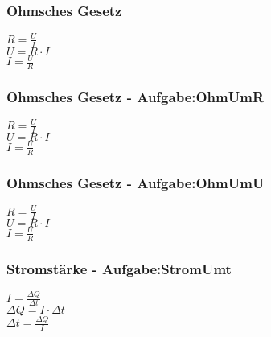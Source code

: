 \subsubsection{Ohmsches Gesetz} 
\begin{minipage}{0.45\textwidth} 
$ R = \frac{U}{I} $\\ 
$ U = R\cdot I $\\ 
$ I = \frac{U}{R} $\\ 
\end{minipage} 
\begin{minipage}{0.45\textwidth} 
 
\end{minipage} 
\subsubsection{Ohmsches Gesetz - Aufgabe:OhmUmR} 
\begin{minipage}{0.45\textwidth} 
$ R = \frac{U}{I} $\\ 
$ U = R\cdot I $\\ 
$ I = \frac{U}{R} $\\ 
\end{minipage} 
\begin{minipage}{0.45\textwidth} 
 
\end{minipage} 
\subsubsection{Ohmsches Gesetz - Aufgabe:OhmUmU} 
\begin{minipage}{0.45\textwidth} 
$ R = \frac{U}{I} $\\ 
$ U = R\cdot I $\\ 
$ I = \frac{U}{R} $\\ 
\end{minipage} 
\begin{minipage}{0.45\textwidth} 
 
\end{minipage} 
\subsubsection{Stromstärke - Aufgabe:StromUmt} 
\begin{minipage}{0.45\textwidth} 
$ I = \frac{\Delta Q}{\Delta t} $\\ 
$ \Delta Q =I\cdot \Delta t $\\ 
$ \Delta t = \frac{\Delta Q}{I} $\\ 
\end{minipage} 
\begin{minipage}{0.45\textwidth} 
 
\end{minipage} 
